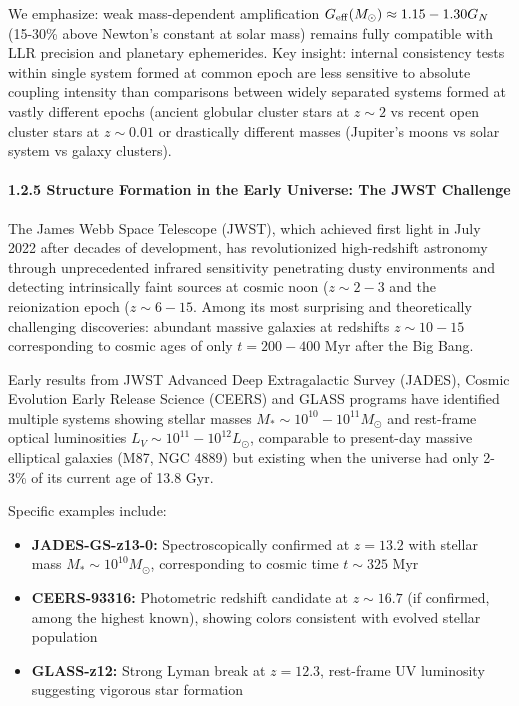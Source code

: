 \documentclass[11pt,a4paper]{article}
\providecommand{\tightlist}{\setlength{\itemsep}{0pt}\setlength{\parskip}{0pt}}
\begin{document}
We emphasize: weak mass-dependent amplification
\(G_{\rm eff}(M_\odot) \approx 1.15-1.30 G_N\) (15-30\% above Newton's
constant at solar mass) remains fully compatible with LLR precision and
planetary ephemerides. Key insight: internal consistency tests within
single system formed at common epoch are less sensitive to absolute
coupling intensity than comparisons between widely separated systems
formed at vastly different epochs (ancient globular cluster stars at
\(z \sim 2\) vs recent open cluster \cite{Geller2015} stars at \(z \sim 0.01\) or
drastically different masses (Jupiter's moons vs solar system vs galaxy
clusters).

\hypertarget{structure-formation-in-the-early-universe-the-jwst-challenge}{%
\paragraph{1.2.5 Structure Formation in the Early Universe: The JWST
Challenge}\label{structure-formation-in-the-early-universe-the-jwst-challenge}}

The James Webb Space Telescope (JWST), which achieved first light in
July 2022 after decades of development, has revolutionized high-redshift
astronomy through unprecedented infrared sensitivity penetrating dusty
environments and detecting intrinsically faint sources at cosmic noon
(\(z \sim 2-3\) and the reionization epoch (\(z \sim 6-15\). Among its
most surprising and theoretically challenging discoveries: abundant
massive galaxies at redshifts \(z \sim 10-15\) corresponding to cosmic
ages of only \(t = 200-400\) Myr after the Big Bang.

Early results from JWST Advanced Deep Extragalactic Survey (JADES),
Cosmic Evolution Early Release Science (CEERS) and GLASS programs have
identified multiple systems showing stellar masses
\(M_* \sim 10^{10}-10^{11} M_\odot\) and rest-frame optical luminosities
\(L_V \sim 10^{11}-10^{12} L_\odot\), comparable to present-day massive
elliptical galaxies (M87, NGC 4889) but existing when the universe had
only 2-3\% of its current age of 13.8 Gyr.

Specific examples include:

\begin{itemize}
\tightlist
\item
  \textbf{JADES-GS-z13-0:} Spectroscopically confirmed at \(z = 13.2\)
  with stellar mass \(M_* \sim 10^{10} M_\odot\), corresponding to
  cosmic time \(t \sim 325\) Myr
\item
  \textbf{CEERS-93316:} Photometric redshift candidate at
  \(z \sim 16.7\) (if confirmed, among the highest known), showing
  colors consistent with evolved stellar population
\item
  \textbf{GLASS-z12:} Strong Lyman break at \(z = 12.3\), rest-frame UV
  luminosity suggesting vigorous star formation
\end{itemize}
\end{document}
